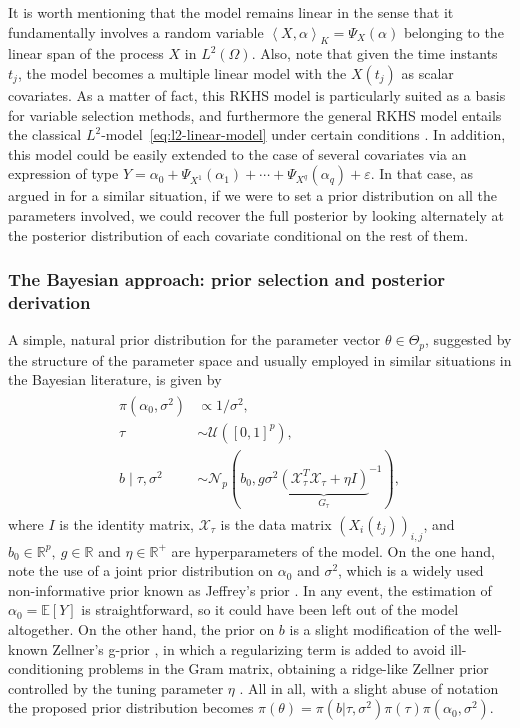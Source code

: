 \documentclass{article}
\numberwithin{equation}{section}
\theoremstyle{plain}
\renewcommand{\epsilon}{\varepsilon}
\newcommand{\R}{\mathbb{R}}
\newcommand{\E}{\mathbb{E}}
\newcommand\dotprod[2]{\left\langle#1,#2\right\rangle}
\begin{document}
It is worth mentioning that the model remains linear in the sense that it fundamentally involves a random variable \(\dotprod{X}{\alpha}_K = \Psi_X(\alpha)\) belonging to the linear span of the process \(X\) in \(L^2(\Omega)\). Also, note that given the time instants \(t_j\), the model becomes a multiple linear model with the \(X(t_j)\) as scalar covariates. As a matter of fact, this RKHS model is particularly suited as a basis for variable selection methods, and furthermore the general RKHS model entails the classical \(L^2\)-model~\eqref{eq:l2-linear-model} under certain conditions \citep[see][Section~3]{berrendero2020general}. In addition, this model could be easily extended to the case of several covariates via an expression of type \(Y=\alpha_0 + \Psi_{X^{1}}(\alpha_1) + \cdots + \Psi_{X^{q}}(\alpha_q) + \epsilon\). In that case, as argued in \citet{grollemund2019bayesian} for a similar situation, if we were to set a prior distribution on all the parameters involved, we could recover the full posterior by looking alternately at the posterior distribution of each covariate conditional on the rest of them.

\subsubsection*{The Bayesian approach: prior selection and posterior derivation}

A simple, natural prior distribution for the parameter vector \(\theta \in \Theta_p\), suggested by the structure of the parameter space and usually employed in similar situations in the Bayesian literature, is given by
\begin{align}\label{eq:prior-linear}
  \begin{split}
    \pi(\alpha_0, \sigma^2) & \propto 1/\sigma^2,\\
    \tau                    & \sim \mathcal U([0, 1]^p),\\
    b\mid \tau, \sigma^2    & \sim \mathcal N_p(b_0, g\sigma^2{\underbrace{\left(\mathcal X_\tau^T \mathcal X_\tau + \eta I\right)}_{G_\tau}}^{-1}),
  \end{split}
\end{align}
where \(I\) is the identity matrix, \(\mathcal X_\tau\) is the data matrix \((X_i(t_j))_{i,j}\), and \(b_0\in \R^p, \ g \in \R\) and \(\eta \in \R^+\) are hyperparameters of the model. On the one hand, note the use of a joint prior distribution on \(\alpha_0\) and \(\sigma^2\), which is a widely used non-informative prior known as Jeffrey's prior \citep{jeffreys1946invariant}. In any event, the estimation of \(\alpha_0=\E[Y]\) is straightforward, so it could have been left out of the model altogether. On the other hand, the prior on \(b\) is a slight modification of the well-known Zellner's g-prior \citep{zellner1986assessing}, in which a regularizing term is added to avoid ill-conditioning problems in the Gram matrix, obtaining a ridge-like Zellner prior controlled by the tuning parameter \(\eta\) \citep{baragatti2012study}. All in all, with a slight abuse of notation the proposed prior distribution becomes \(\pi(\theta) = \pi(b| \tau, \sigma^2)\pi(\tau)\pi(\alpha_0, \sigma^2)\).
\end{document}

